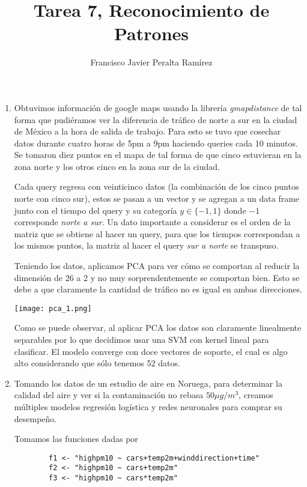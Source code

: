\documentclass{article}
\title {Tarea 7, Reconocimiento de Patrones}
\author {Francisco Javier Peralta Ramírez}
\date{\vspace{-2ex}}
\begin{document}
\vspace{-2ex}
\maketitle

\begin{enumerate}

    \item Obtuvimos información de google maps usando la librería \emph{gmapdistance} de tal forma que pudiéramos ver la diferencia de tráfico de norte a sur en la ciudad de México a la hora de salida de trabajo. Para esto se tuvo que cosechar datos durante cuatro horas de 5pm a 9pm haciendo queries cada 10 minutos. Se tomaron diez puntos en el mapa de tal forma de que cinco estuvieran en la zona norte y los otros cinco en la zona sur de la ciudad.

    Cada query regresa con veinticinco datos (la combinación de los cinco puntos norte con cinco sur), estos se pasan a un vector y se agregan a un data frame junto con el tiempo del query y su categoría $y\in\{-1, 1\}$ donde $-1$ corresponde \emph{norte a sur}. Un dato importante a considerar es el orden de la matriz que se obtiene al hacer un query, para que los tiempos correspondan a los mismos puntos, la matriz al hacer el query \emph{sur a norte} se transpuso.

    Teniendo los datos, aplicamos PCA para ver cómo se comportan al reducir la dimensión de 26 a 2 y no muy sorprendentemente se comportan bien. Esto se debe a que claramente la cantidad de tráfico no es igual en ambas direcciones.
    \begin{center}
    \texttt{[image: pca\_1.png]}
    \end{center}

    Como se puede observar, al aplicar PCA los datos son claramente linealmente separables por lo que decidimos usar una SVM con kernel lineal para clasificar. El modelo converge con doce vectores de soporte, el cual es algo alto considerando que sólo tenemos 52 datos.

    \item Tomando los datos de un estudio de aire en Noruega, para determinar la calidad del aire y ver si la contaminación no rebasa $50 \mu g/m^3$, creamos múltiples modelos regresión logística y redes neuronales para comprar su desempeño.

    Tomamos las funciones dadas por

    \begin{lstlisting}
        f1 <- "highpm10 ~ cars+temp2m+winddirection+time"
        f2 <- "highpm10 ~ cars+temp2m"
        f3 <- "highpm10 ~ cars*temp2m"
    \end{lstlisting}


\end{enumerate}
\end{document}
